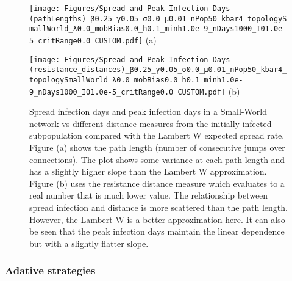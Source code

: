 \begin{figure}[!ht]
	\centering
	\begin{minipage}[b]{0.45\textwidth}
		\texttt{[image: Figures/Spread and Peak Infection Days (pathLengths)\_β0.25\_γ0.05\_σ0.0\_μ0.01\_nPop50\_kbar4\_topologySmallWorld\_λ0.0\_mobBias0.0\_h0.1\_minh1.0e-9\_nDays1000\_I01.0e-5\_critRange0.0 CUSTOM.pdf]}
		\centering
		(a)
	\end{minipage}
	\hfill
	\begin{minipage}[b]{0.45\textwidth}
		\texttt{[image: Figures/Spread and Peak Infection Days (resistance\_distances)\_β0.25\_γ0.05\_σ0.0\_μ0.01\_nPop50\_kbar4\_topologySmallWorld\_λ0.0\_mobBias0.0\_h0.1\_minh1.0e-9\_nDays1000\_I01.0e-5\_critRange0.0 CUSTOM.pdf]}
		\centering
		(b)
	\end{minipage}
	\caption{\small Spread infection days and peak infection days in a Small-World network vs different distance measures from the initially-infected subpopulation compared with the Lambert W expected spread rate. Figure (a) shows the path length (number of consecutive jumps over connections). The plot shows some variance at each path length and has a slightly higher slope than the Lambert W approximation. Figure (b) uses the resistance distance measure which evaluates to a real number that is much lower value. The relationship between spread infection and distance is more scattered than the path length. However, the Lambert W is a better approximation here. It can also be seen that the peak infection days maintain the linear dependence but with a slightly flatter slope. }
	\label{fig: Watts Strogatz spread days path lengths and resistance distances}
\end{figure}

\subsubsection{Adative strategies}


